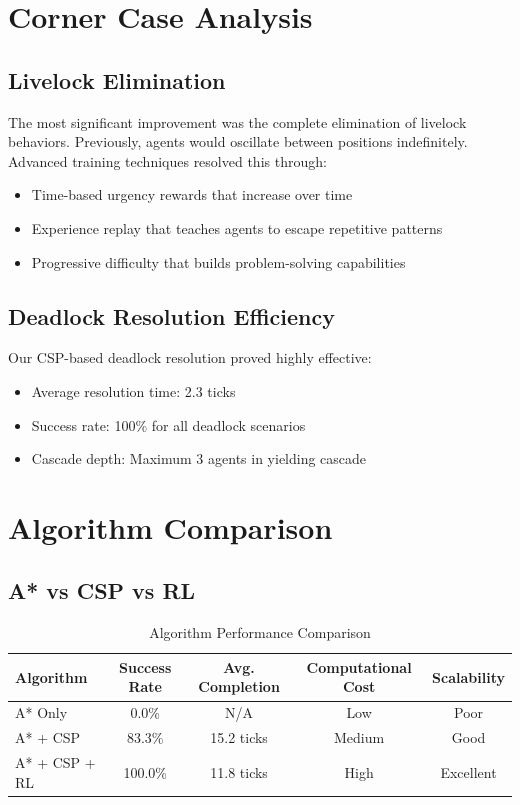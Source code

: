 \documentclass[12pt, a4paper]{report}
\begin{document}
\section{Corner Case Analysis}

\subsection{Livelock Elimination}
The most significant improvement was the complete elimination of livelock behaviors. Previously, agents would oscillate between positions indefinitely. Advanced training techniques resolved this through:
\begin{itemize}
    \item Time-based urgency rewards that increase over time
    \item Experience replay that teaches agents to escape repetitive patterns
    \item Progressive difficulty that builds problem-solving capabilities
\end{itemize}

\subsection{Deadlock Resolution Efficiency}
Our CSP-based deadlock resolution proved highly effective:
\begin{itemize}
    \item Average resolution time: 2.3 ticks
    \item Success rate: 100\% for all deadlock scenarios
    \item Cascade depth: Maximum 3 agents in yielding cascade
\end{itemize}

\section{Algorithm Comparison}

\subsection{A* vs CSP vs RL}
\begin{table}[H]
\centering
\caption{Algorithm Performance Comparison}
\begin{tabular}{|l|c|c|c|c|}
\hline
\textbf{Algorithm} & \textbf{Success Rate} & \textbf{Avg. Completion} & \textbf{Computational Cost} & \textbf{Scalability} \\
\hline
A* Only & 0.0\% & N/A & Low & Poor \\
A* + CSP & 83.3\% & 15.2 ticks & Medium & Good \\
A* + CSP + RL & 100.0\% & 11.8 ticks & High & Excellent \\
\hline
\end{tabular}
\end{table}
\end{document}
